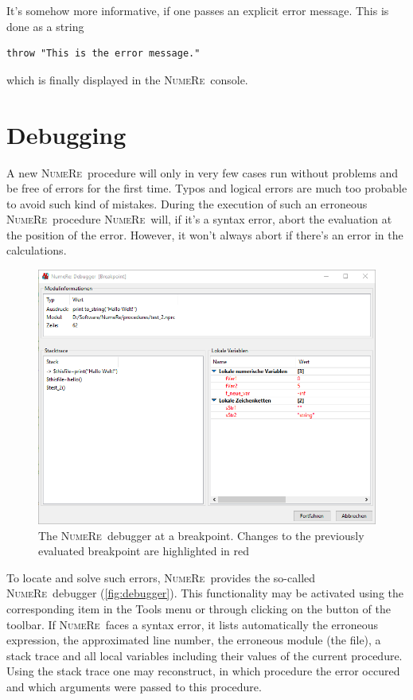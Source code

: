\documentclass[DIV=14,headsepline,footsepline]{scrbook}
\newcommand{\NR}{\textsc{Nu\-me\-Re}}
\begin{document}
				It's somehow more informative, if one passes an explicit error message. This is done as a string
				\begin{lstlisting}
throw "This is the error message."
				\end{lstlisting}
				which is finally displayed in the \NR\ console.
			\section{Debugging}
				A new \NR\ procedure will only in very few cases run without problems and be free of errors for the first time. Typos and logical errors are much too probable to avoid such kind of mistakes. During the execution of such an erroneous \NR\ procedure \NR\ will, if it's a syntax error, abort the evaluation at the position of the error. However, it won't always abort if there's an error in the calculations.
				\begin{figure}[htb]
					\centering
					\includegraphics[width=\textwidth]{_graphics/debugger.png}%
					\caption{The \NR\ debugger at a breakpoint. Changes to the previously evaluated breakpoint are highlighted in red}%
					\label{fig:debugger}%
				\end{figure}
				
				To locate and solve such errors, \NR\ provides the so-called \NR\ debugger (\autoref{fig:debugger}). This functionality may be activated using the corresponding item in the Tools menu or through clicking on the button of the toolbar. If \NR\ faces a syntax error, it lists automatically the erroneous expression, the approximated line number, the erroneous module (the file), a stack trace and all local variables including their values of the current procedure. Using the stack trace one may reconstruct, in which procedure the error occured and which arguments were passed to this procedure.
				
\end{document}
